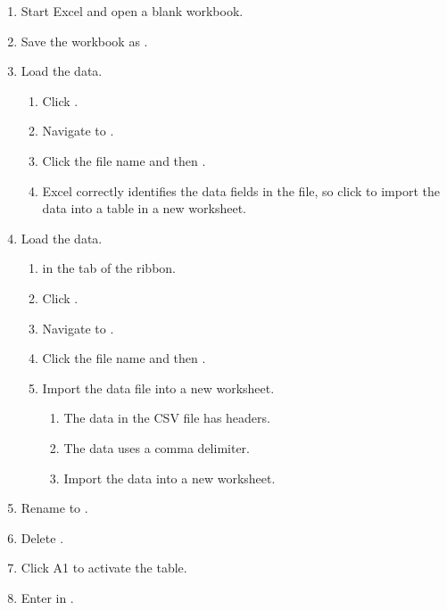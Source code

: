 \begin{enumerate}
	\item Start Excel and open a blank workbook.
	\item Save the workbook as .
	\item {} Load the data.
	
	\begin{enumerate}
		\item Click .
		\item Navigate to .
		\item Click the file name and then .
		\item Excel correctly identifies the data fields in the file, so click  to import the data into a table in a new worksheet.	
	\end{enumerate}		

	\item {} Load the data.
		
	\begin{enumerate}		
		\item {} in the  tab of the ribbon.
		\item Click . 
		\item Navigate to .
		\item Click the file name and then .
		\item Import the data file into a new worksheet.
		\begin{enumerate}
			\item The data in the CSV file has headers.
			\item The data uses a comma delimiter.
			\item Import the data into a new worksheet.
		\end{enumerate}
	\end{enumerate}
		
	\item Rename  to .
	\item Delete .
	\item Click A1 to activate the table.
	\item Enter  in .
\end{enumerate}

